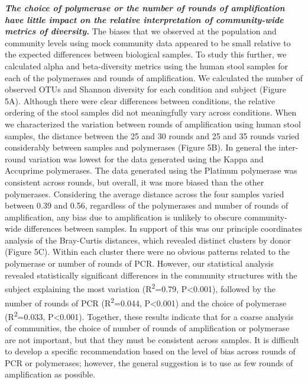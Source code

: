 \documentclass[11pt,]{article}
\begin{document}
\textbf{\emph{The choice of polymerase or the number of rounds of
amplification have little impact on the relative interpretation of
community-wide metrics of diversity.}} The biases that we observed at
the population and community levels using mock community data appeared
to be small relative to the expected differences between biological
samples. To study this further, we calculated alpha and beta-diversity
metrics using the human stool samples for each of the polymerases and
rounds of amplification. We calculated the number of observed OTUs and
Shannon diversity for each condition and subject (Figure 5A). Although
there were clear differences between conditions, the relative ordering
of the stool samples did not meaningfully vary across conditions. When
we characterized the variation between rounds of amplification using
human stool samples, the distance between the 25 and 30 rounds and 25
and 35 rounds varied considerably between samples and polymerases
(Figure 5B). In general the inter-round variation was lowest for the
data generated using the Kappa and Accuprime polymerases. The data
generated using the Platinum polymerase was consistent across rounds,
but overall, it was more biased than the other polymerases. Considering
the average distance across the four samples varied between 0.39 and
0.56, regardless of the polymerases and number of rounds of
amplification, any bias due to amplification is unlikely to obscure
community-wide differences between samples. In support of this was our
principle coordinates analysis of the Bray-Curtis distances, which
revealed distinct clusters by donor (Figure 5C). Within each cluster
there were no obvious patterns related to the polymerase or number of
rounds of PCR. However, our statistical analysis revealed statistically
significant differences in the community structures with the subject
explaining the most variation (R\textsuperscript{2}=0.79,
P\textless{}0.001), followed by the number of rounds of PCR
(R\textsuperscript{2}=0.044, P\textless{}0.001) and the choice of
polymerase (R\textsuperscript{2}=0.033, P\textless{}0.001). Together,
these results indicate that for a coarse analysis of communities, the
choice of number of rounds of amplification or polymerase are not
important, but that they must be consistent across samples. It is
difficult to develop a specific recommendation based on the level of
bias across rounds of PCR or polymerases; however, the general
suggestion is to use as few rounds of amplification as possible.
\end{document}
